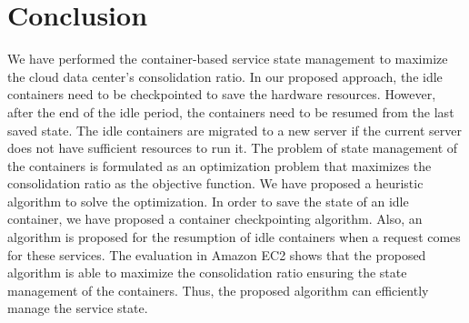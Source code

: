 \chapter{Conclusion}

We have performed the container-based service state management to maximize the cloud data center’s consolidation ratio. In our proposed approach, the idle containers need to
be checkpointed to save the hardware resources. However,
after the end of the idle period, the containers need to be
resumed from the last saved state. The idle containers are
migrated to a new server if the current server does not have
sufficient resources to run it. The problem of state management
of the containers is formulated as an optimization problem that
maximizes the consolidation ratio as the objective function. We
have proposed a heuristic algorithm to solve the optimization.
In order to save the state of an idle container, we have proposed
a container checkpointing algorithm. Also, an algorithm is
proposed for the resumption of idle containers when a request
comes for these services. The evaluation in Amazon EC2
shows that the proposed algorithm is able to maximize the
consolidation ratio ensuring the state management of the containers. Thus, the proposed algorithm can efficiently manage
the service state.
